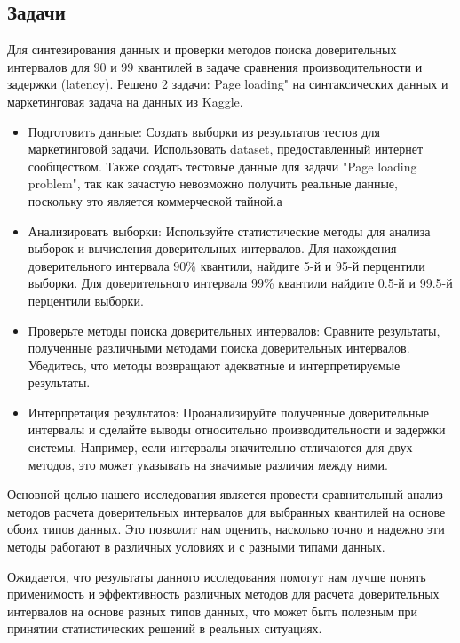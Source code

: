 \documentclass[specialist,
               substylefile = spbu_report.rtx,
               subf,href,colorlinks=true, 12pt]{disser}
\begin{document}
\subsection{Задачи}
Для синтезирования данных и проверки методов поиска доверительных интервалов для 90 и 99 квантилей в задаче сравнения производительности и задержки (latency). Решено 2 задачи:  Page loading" на синтаксических данных и маркетинговая задача на данных из  Kaggle.
\begin{itemize}

\item Подготовить данные: Создать выборки из результатов тестов для маркетинговой задачи. Использовать dataset, предоставленный интернет сообществом. Также создать тестовые данные для задачи "Page loading problem", так как зачастую невозможно получить реальные данные, поскольку это является коммерческой тайной.а
\item Анализировать выборки: Используйте статистические методы для анализа выборок и вычисления доверительных интервалов. Для нахождения доверительного интервала 90\% квантили, найдите 5-й и 95-й перцентили выборки. Для доверительного интервала 99\% квантили найдите 0.5-й и 99.5-й перцентили выборки.

\item  Проверьте методы поиска доверительных интервалов: Сравните результаты, полученные различными методами поиска доверительных интервалов. Убедитесь, что методы возвращают адекватные и интерпретируемые результаты.

\item Интерпретация результатов: Проанализируйте полученные доверительные интервалы и сделайте выводы относительно производительности и задержки системы. Например, если интервалы значительно отличаются для двух методов, это может указывать на значимые различия между ними.
\end{itemize}

Основной целью нашего исследования является провести сравнительный анализ методов расчета доверительных интервалов для выбранных квантилей на основе обоих типов данных. Это позволит нам оценить, насколько точно и надежно эти методы работают в различных условиях и с разными типами данных.

Ожидается, что результаты данного исследования помогут нам лучше понять применимость и эффективность различных методов для расчета доверительных интервалов на основе разных типов данных, что может быть полезным при принятии статистических решений в реальных ситуациях.
\end{document}
